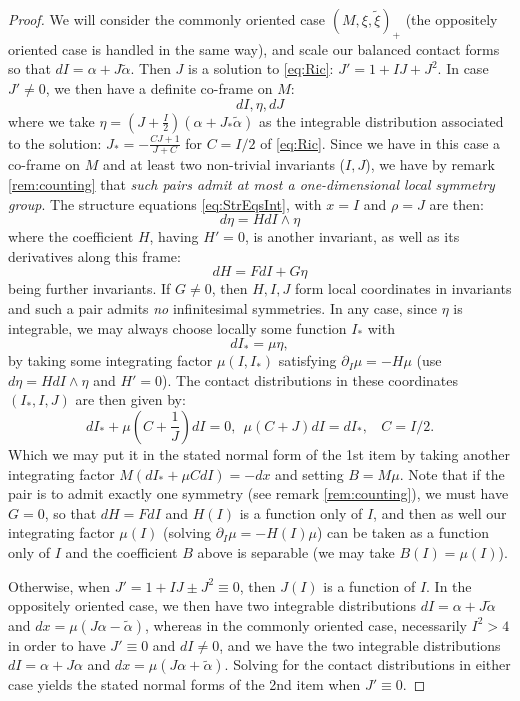 \documentclass[10pt]{amsart}
\newcommand{\del}{\partial}
\theoremstyle{definition}
\begin{document}
\begin{proof}
    We will consider the commonly oriented case $(M, \xi, \tilde \xi)_+$ (the oppositely oriented case is handled in the same way), and scale our balanced contact forms so that $dI = \alpha + J\tilde\alpha$. Then $J$ is a solution to \eqref{eq:Ric}: $J' = 1 + IJ + J^2$.
In case $J'\ne 0$, we then have a definite co-frame on $M$:
\[ dI, \eta, dJ \]
where we take $\eta = (J + \frac{I}{2})( \alpha + J_* \tilde\alpha)$
as the integrable distribution associated to the solution: $J_* = - \frac{CJ + 1}{J+C}$ for $C = I/2$ of \eqref{eq:Ric}. Since we have in this case a co-frame on $M$ and at least two non-trivial invariants ($I,J$), we have by remark \ref{rem:counting} that {\em such pairs admit at most a one-dimensional local symmetry group}.  The structure equations \eqref{eq:StrEqsInt}, with $x = I$ and $\rho = J$ are then:
\[ d\eta = H dI \wedge\eta \]
where the coefficient $H$, having $H' = 0$, is another invariant, as well as its derivatives along this frame:
\begin{equation}\label{eq:G}
    dH = F dI + G \eta
\end{equation} 
being further invariants. If $G \ne 0$, then $H, I, J$ form local coordinates in invariants and such a pair admits {\em no} infinitesimal symmetries.
In any case, since $\eta$ is integrable, we may always choose locally some function $I_*$ with
\[ dI_* = \mu\eta,\]
by taking some integrating factor $\mu(I, I_*)$ satisfying $\del_I\mu = - H\mu$ (use $d\eta = HdI\wedge \eta$ and $H' = 0$). The contact distributions in these coordinates $(I_*, I, J)$ are then given by:
\[ dI_* + \mu (C + \frac{1}{J}) dI = 0, ~~\mu(C+J)dI = dI_*, ~~~~C = I/2. \]
Which we may put it in the stated normal form of the 1st item by taking another integrating factor $M( dI_* + \mu C dI) = - dx$
and setting $B = M\mu$. 
Note that if the pair is to admit exactly one symmetry (see remark \ref{rem:counting}), we must have $G = 0$, so that $dH = FdI$ and $H(I)$ is a function only of $I$, and then as well our integrating factor $\mu(I)$ (solving $\del_I\mu = - H(I)\mu$) can be taken as a function only of $I$ and the coefficient $B$ above is separable (we may take $B(I) = \mu(I)$). 

 Otherwise, when $J' = 1 + IJ \pm J^2 \equiv 0$, then $J(I)$ is a function of $I$. In the oppositely oriented case, we then have two integrable distributions $dI = \alpha + J\tilde\alpha$ and $dx = \mu ( J\alpha - \tilde\alpha)$, whereas in the commonly oriented case, necessarily  $I^2 > 4$ in order to have $J'\equiv 0$ and $dI\ne 0$, and we have the two integrable distributions $dI = \alpha + J\alpha$ and $dx = \mu ( J\alpha + \tilde\alpha)$. Solving for the contact distributions in either case yields the stated normal forms of the 2nd item when $J' \equiv 0$.
\end{proof}
\end{document}
